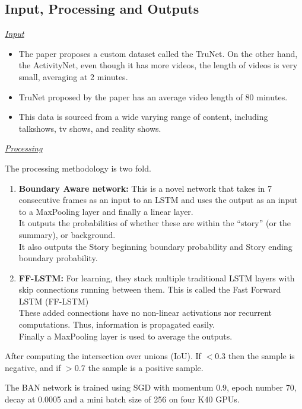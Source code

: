     \subsection{Input, Processing and Outputs}
    	
    	\textit{\underline{Input}}
    	
    		\begin{itemize}
    			\item The paper proposes a custom dataset called the TruNet. On the other hand, the ActivityNet, even though it has more videos, the length of videos is very small, averaging at 2 minutes.
    			\item TruNet proposed by the paper has an average video length of 80 minutes.
    			\item This data is sourced from a wide varying range of content, including talkshows, tv shows, and reality shows.
    		\end{itemize}
    		
    	\textit{\underline{Processing}}
    	
    		The processing methodology is two fold. 
    		
    		\begin{enumerate}
    			\item \textbf{Boundary Aware network:} This is a novel network that takes in 7 consecutive frames as an input to an LSTM and uses the output as an input to a MaxPooling layer and finally a linear layer. \\ It outputs the probabilities of whether these are within the “story” (or the summary),  or background. \\ It also outputs the Story beginning boundary probability and Story ending boundary probability.
    			\item \textbf{FF-LSTM:} For learning, they stack multiple traditional LSTM layers with skip connections running between them. This is called the Fast Forward LSTM (FF-LSTM) \\ These added connections have no non-linear activations nor recurrent computations. Thus, information is propagated easily. \\ Finally a MaxPooling layer is used to average the outputs.
    		\end{enumerate}
    		
    		After computing the intersection over unions (IoU). If \(<\)0.3 then the sample is negative, and if \(>\)0.7 the sample is a positive sample.
    		
    		The BAN network is trained using SGD with momentum 0.9, epoch number 70, decay at 0.0005 and a mini batch size of 256 on four K40 GPUs.
    		
